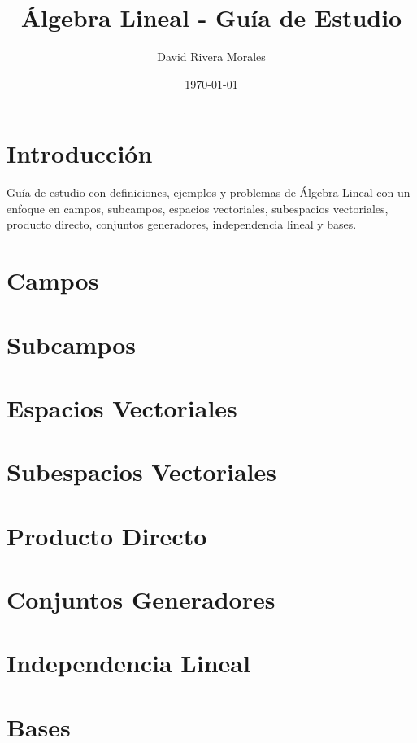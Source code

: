 \documentclass{article}
\title{Álgebra Lineal - Guía de Estudio}
\author{David Rivera Morales}
\date{\today}
\begin{document}
\maketitle

\section{Introducción}

Guía de estudio con definiciones, ejemplos y problemas de Álgebra Lineal con un enfoque en campos, subcampos, espacios vectoriales, subespacios vectoriales, producto directo, conjuntos generadores, independencia lineal y bases.

\section{Campos}



\section{Subcampos}



\section{Espacios Vectoriales}



\section{Subespacios Vectoriales}



\section{Producto Directo}



\section{Conjuntos Generadores}



\section{Independencia Lineal}



\section{Bases}


\end{document}
